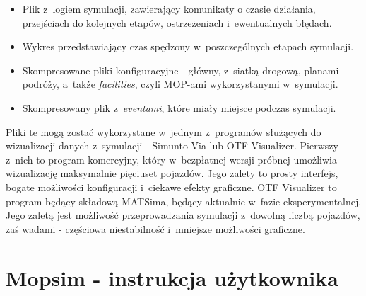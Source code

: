 \begin{itemize}
\item Plik z~logiem symulacji, zawierający komunikaty o czasie działania, przejściach do kolejnych etapów, ostrzeżeniach i~ewentualnych błędach.
\item Wykres przedstawiający czas spędzony w~poszczególnych etapach symulacji.
\item Skompresowane pliki konfiguracyjne - główny, z~siatką drogową, planami podróży, a~także \textit{facilities}, czyli MOP-ami wykorzystanymi w~symulacji.
\item Skompresowany plik z~\textit{eventami}, które miały miejsce podczas symulacji.
\end{itemize}
Pliki te mogą zostać wykorzystane w~jednym z~programów służących do wizualizacji danych z~symulacji - Simunto Via lub OTF Visualizer. Pierwszy z~nich to program komercyjny, który w~bezpłatnej wersji próbnej umożliwia wizualizację maksymalnie pięciuset pojazdów. Jego zalety to prosty interfejs, bogate możliwości konfiguracji i~ciekawe efekty graficzne. OTF Visualizer to program będący składową MATSima, będący aktualnie w~fazie eksperymentalnej. Jego zaletą jest możliwość przeprowadzania symulacji z~dowolną liczbą pojazdów, zaś wadami - częściowa niestabilność i~mniejsze możliwości graficzne.

\section[Instrukcja użytkownika]{Mopsim - instrukcja użytkownika}
